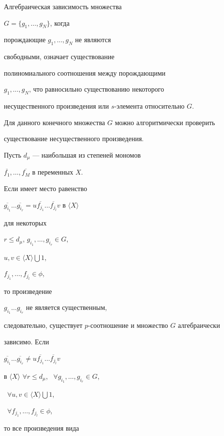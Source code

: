 Алгебраическая зависимость множества


$G=\lbrace g_{1},\dotsc,g_{N}\rbrace$, когда


порождающие $g_{1},\dotsc,g_{N}$ не являются


свободными, означает существование


полиномиального соотношения между порождающими


$g_{1},\dotsc,g_{N}$, что равносильно существованию некоторого


несущественного произведения или $s$-элемента относительно $G$.


Для данного конечного множества $G$ можно алгоритмически проверить


существование несущественного произведения.








Пусть $d_{\mu}$ --- наибольшая из степеней мономов 


$\overline{f_{1}},\dotsc,\overline{f_{M}}$ в переменных $X$.


Если имеет место равенство


$\overline{g_{i_{1}}}\dotsc\overline{g_{i_{r}}}=


u\overline{f_{j_{1}}}\dotsc\overline{f_{j_{l}}}v$ в $\langle X\rangle$


для некоторых


$r\leq d_{\mu}$, $g_{i_{1}},\dotsc,g_{i_{r}}\in G$,


$u,v\in\langle X\rangle\bigcup 1$,


$f_{j_{1}},\dotsc,f_{j_{l}}\in\phi$,


то произведение


$g_{i_{1}}\dotsc g_{i_{r}}$ не является существенным,


следовательно, существует $p$-соотношение и множество $G$ алгебраически


зависимо. Если


$\overline{g_{i_{1}}}\dotsc\overline{g_{i_{r}}}\ne


u\overline{f_{j_{1}}}\dotsc\overline{f_{j_{l}}}v$


в $\langle X\rangle$ $\forall r{\leq} d_{\mu}$, \ $\forall


g_{i_{1}},\dotsc,g_{i_{r}}\in G$,


\ $\forall u,v\in\langle X\rangle\bigcup 1$,


\ $\forall f_{j_{1}},\dotsc,f_{j_{l}}\in\phi$,


то все произведения вида


